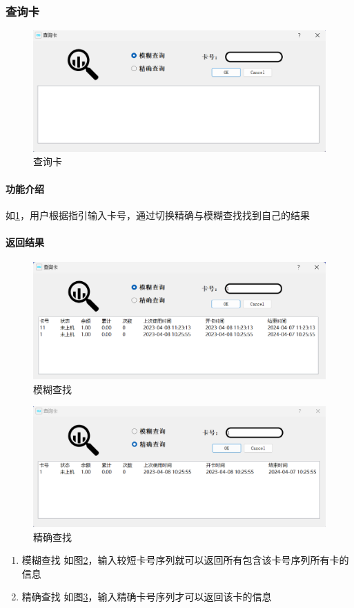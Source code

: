 \documentclass{article}
\begin{document}
    \subsubsection{查询卡}
    \begin{figure}[h]
        \centering
        \includegraphics[scale=0.5]{figure/query.png}
        \caption{查询卡}
        \label{query}
    \end{figure}
    \paragraph{功能介绍}
    如\ref{query}，用户根据指引输入卡号，通过切换精确与模糊查找找到自己的结果
    \paragraph{返回结果}
    \begin{figure}[h]
        \centering
        \includegraphics[scale=0.5]{figure/query_big.png}
        \caption{模糊查找}
        \label{query_big}
    \end{figure}
    \begin{figure}[h]
        \centering
        \includegraphics[scale=0.5]{figure/query_small.png}
        \caption{精确查找}
        \label{query_small}
    \end{figure}
    \begin{enumerate}
        \item 模糊查找 如图\ref{query_big}，输入较短卡号序列就可以返回所有包含该卡号序列所有卡的信息
        \item 精确查找 如图\ref{query_small}，输入精确卡号序列才可以返回该卡的信息
    \end{enumerate}
\end{document}
